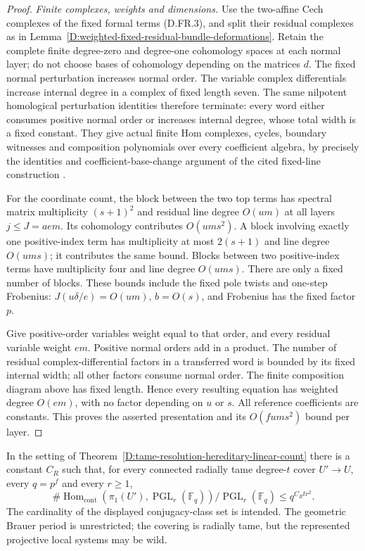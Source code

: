 \begin{proof}
\emph{Finite complexes, weights and dimensions.}
Use the two-affine Cech complexes of the fixed formal
terms (D.FR.3), and split their residual complexes as
in Lemma~\ref{D:weighted-fixed-residual-bundle-deformations}.
Retain the complete finite degree-zero and degree-one
cohomology spaces at each normal layer; do not choose
bases of cohomology depending on the matrices $d$.
The fixed normal perturbation increases normal order.
The variable complex differentials increase internal
degree in a complex of fixed length seven. The same
nilpotent homological perturbation identities therefore
terminate: every word either consumes positive normal
order or increases internal degree, whose total width
is a fixed constant. They give actual finite Hom
complexes, cycles, boundary witnesses and composition
polynomials over every coefficient algebra, by precisely
the identities and coefficient-base-change argument of
the cited fixed-line construction
\citep[Sections2.1--2.4, complete proof, and3.2]
{C_Crainic2004Perturbation}.

For the coordinate count, the block between the two
top terms has spectral matrix multiplicity $(s+1)^2$
and residual line degree $O(um)$ at all layers
$j\leq J=ae m$. Its cohomology contributes $O(um s^2)$.
A block involving exactly one positive-index term has
multiplicity at most $2(s+1)$ and line degree $O(um s)$;
it contributes the same bound. Blocks between two
positive-index terms have multiplicity four and line
degree $O(um s)$. There are only a fixed number of
blocks. These bounds include the fixed pole twists and
one-step Frobenius: $J(u\delta/e)=O(um)$, $b=O(s)$,
and Frobenius has the fixed factor $p$.

Give positive-order variables weight equal to that
order, and every residual variable weight $em$.
Positive normal orders add in a product. The number of
residual complex-differential factors in a transferred
word is bounded by its fixed internal width; all other
factors consume normal order. The finite composition
diagram above has fixed length. Hence every resulting
equation has weighted degree $O(em)$, with no factor
depending on $u$ or $s$. All reference coefficients are
constants. This proves the asserted presentation and
its $O(fum s^2)$ bound per layer.
\end{proof}

\begin{theorem}
\label{D:tame-hereditary-projective-count}
In the setting of Theorem~\ref{D:tame-resolution-hereditary-linear-count}
there is a constant $C_R$ such that, for every connected
radially tame degree-$t$ cover $U'\to U$, every $q=p^f$
and every $r\geq1$,
\[
 \#\operatorname{Hom}_{\mathrm{cont}}
     (\pi_1(U'),\operatorname{PGL}_r(\mathbb F_q))
                      /\operatorname{PGL}_r(\mathbb F_q)
                         \leq q^{C_Rt r^2}.            \tag{D.FR.8}
\]
The cardinality of the displayed conjugacy-class set is
intended. The geometric Brauer period is unrestricted;
the covering is radially tame, but the represented
projective local systems may be wild.
\end{theorem}

